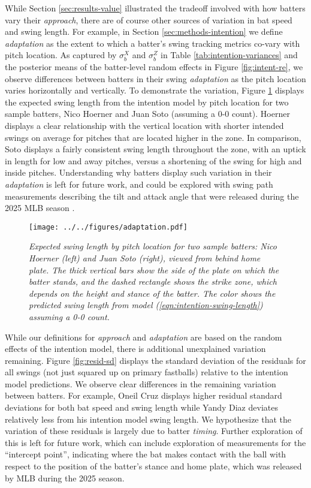 \documentclass[
  12pt]{article}
\begin{document}
    While Section \ref{sec:results-value} illustrated the tradeoff involved with how batters vary their \textit{approach}, there are of course other sources of variation in bat speed and swing length. For example, in Section \ref{sec:methods-intention} we define \textit{adaptation} as the extent to which a batter's swing tracking metrics co-vary with pitch location. As captured by $\sigma_b^X$ and $\sigma_b^Z$ in Table \ref{tab:intention-variances} and the posterior means of the batter-level random effects in Figure \ref{fig:intent-re}, we observe differences between batters in their swing \textit{adaptation} as the pitch location varies horizontally and vertically. To demonstrate the variation, Figure \ref{fig:adaptation} displays the expected swing length from the intention model by pitch location for two sample batters, Nico Hoerner and Juan Soto (assuming a 0-0 count). Hoerner displays a clear relationship with the vertical location with shorter intended swings on average for pitches that are located higher in the zone. In comparison, Soto displays a fairly consistent swing length throughout the zone, with an uptick in length for low and away pitches, versus a shortening of the swing for high and inside pitches. Understanding why batters display such variation in their \textit{adaptation} is left for future work, and could be explored with swing path measurements describing the tilt and attack angle that were released during the 2025 MLB season \citep{petriello_4_2025}.
    
      \begin{figure}
        \centering
        \texttt{[image: ../../figures/adaptation.pdf]}
        \caption{\it Expected swing length by pitch location for two sample batters: Nico Hoerner (left) and Juan Soto (right), viewed from behind home plate. The thick vertical bars show the side of the plate on which the batter stands, and the dashed rectangle shows the strike zone, which depends on the height and stance of the batter. The color shows the predicted swing length  from model (\ref{eqn:intention-swing-length}) assuming a 0-0 count.}
        \label{fig:adaptation}
      \end{figure}

      While our definitions for \textit{approach} and \textit{adaptation} are based on the random effects of the intention model, there is additional unexplained variation remaining. Figure \ref{fig:resid-sd} displays the standard deviation of the residuals for all swings (not just squared up on primary fastballs) relative to the intention model predictions. We observe clear differences in the remaining variation between batters. For example, Oneil Cruz displays higher residual standard deviations for both bat speed and swing length while Yandy Diaz deviates relatively less from his intention model swing length. We hypothesize that the variation of these residuals is largely due to batter \textit{timing}. Further exploration of this is left for future work, which can include exploration of measurements  for the ``intercept point'', indicating where the bat makes contact with the ball with respect to the position of the batter's stance and home plate, which was released by MLB during the 2025 season.
      
\end{document}
